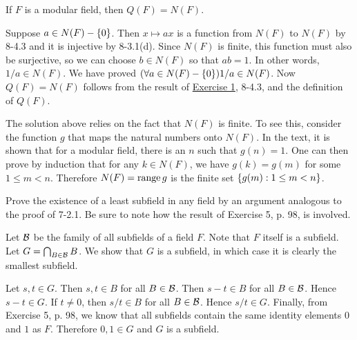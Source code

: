 \begin{exercise}
If $F$ is a modular field, then $Q(F) = N(F)$.
\end{exercise}

\begin{solution}
Suppose $a\in N(F)-\left\{0\right\}$. Then $x \mapsto ax$ is a function from $N(F)$ to $N(F)$ by
8-4.3 and it is injective by 8-3.1(d). Since $N(F)$ is finite, this function must also be
surjective, so we can choose $b\in N(F)$ so that $ab = 1$. In other words, $1/a \in N(F)$. We
have proved $(\forall a\in N(F)-\left\{0\right\})1/a\in N(F)$. Now $Q(F) = N(F)$ follows from the
result of \hyperref[ex:8-4.1]{Exercise 1}, 8-4.3, and the definition of $Q(F)$.

The solution above relies on the fact that $N(F)$ is finite. To see this, consider the function
$g$ that maps the natural numbers onto $N(F)$. In the text, it is shown that for a modular field,
there is an $n$ such that $g(n)=1$. One can then prove by induction that
for any $k\in N(F)$, we have $g(k)=g(m)$ for some $1\leq m < n$. Therefore $N(F)=\operatorname{range} g$
is the finite set $\left\{ g(m) : 1\leq m < n \right\}$.
\end{solution}

\begin{exercise}
Prove the existence of a least subfield in any field by an argument analogous to the
proof of 7-2.1. Be sure to note how the result of Exercise 5, p. 98, is involved.
\end{exercise}

\begin{solution}
Let $\mathcal{B}$ be the family of all subfields of a field $F$. Note that $F$ itself is a subfield.
Let $G=\bigcap_{B\in\mathcal{B}}B$. We show that $G$ is a subfield, in which case it is clearly
the smallest subfield.

Let $s,t\in G$. Then $s,t\in B$ for all $B\in\mathcal{B}$. Then $s-t\in B$ for all $B\in\mathcal{B}$.
Hence $s-t\in G$.
If $t\neq 0$, then $s/t\in B$ for all $B\in\mathcal{B}$.
Hence $s/t\in G$.
Finally, from Exercise 5, p. 98, we know that all subfields contain the same identity
elements $0$ and $1$ as $F$. Therefore $0,1\in G$ and $G$ is a subfield.
\end{solution}

